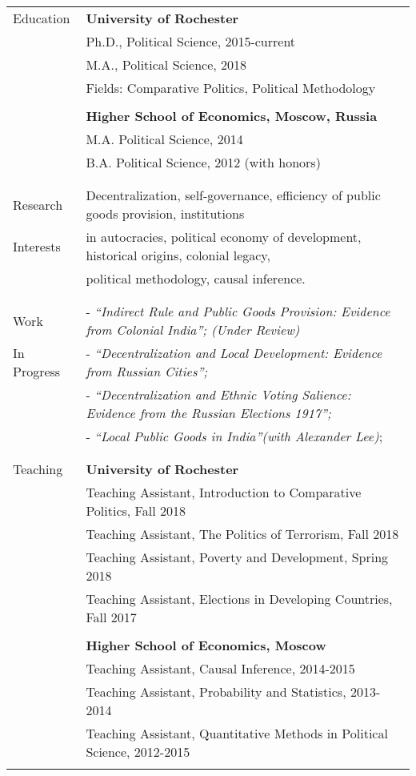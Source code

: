 \documentclass[letterpaper,11pt,oneside]{article}
\begin{document}
\noindent \begin{tabular}{@{} l l}
 \Large{Education}    & \textbf{University of Rochester} \\
     & Ph.D., Political Science, 2015-current \\
     & M.A., Political Science, 2018 \\
     & Fields: Comparative Politics, Political Methodology \\
     \vspace*{-2mm}
     & \\
     & \textbf{Higher School of Economics, Moscow, Russia} \\
     & M.A. Political Science, 2014 \\
     & B.A. Political Science, 2012 (with honors) \\
     & \\

&\\
\Large{Research} & Decentralization, self-governance, efficiency of public goods provision,  institutions  \\
\Large{Interests} &in autocracies, political economy of development, historical origins, colonial legacy, \\
&political methodology, causal inference.\\
 & \\
&\\
\Large{Work}
 & - \textit{``Indirect Rule and Public Goods Provision:
 	Evidence from Colonial India''; (Under Review)}\\
 \Large{In Progress}
 &- \textit{``Decentralization and Local Development: Evidence from Russian Cities'';}\\
 & - \textit{``Decentralization and Ethnic Voting Salience: Evidence from the Russian Elections 1917'';}\\
  &- \textit{``Local Public Goods in India''(with Alexander Lee)};\\
&\\
&\\
 \Large{Teaching}  
 &\textbf{University of Rochester} \\
 & Teaching Assistant, Introduction to Comparative Politics, Fall 2018 \\
 & Teaching Assistant, The Politics of Terrorism, Fall 2018 \\
 & Teaching Assistant, Poverty and Development, Spring 2018 \\
  & Teaching Assistant, Elections in Developing Countries, Fall 2017 \\
  \\
     &\textbf{Higher School of Economics, Moscow} \\
     & Teaching Assistant, Causal Inference, 2014-2015 \\
     & Teaching Assistant, Probability and Statistics, 2013-2014 \\
     & Teaching Assistant, Quantitative Methods in Political Science, 2012-2015 \\
    &\\ 



\end{tabular}
\end{document}

